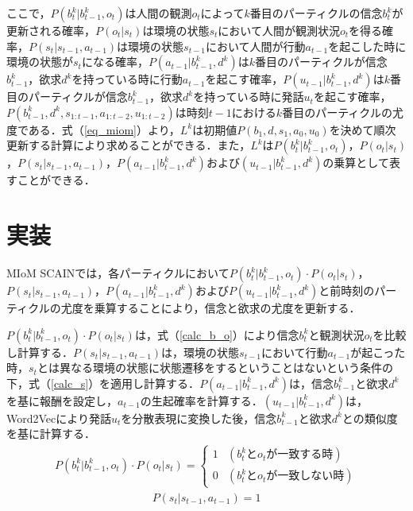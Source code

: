 ここで，$P(b_t^k|b_{t-1}^k,o_t)$は人間の観測$o_t$によって$k$番目のパーティクルの信念$b_t^k$が更新される確率，$P(o_t|s_t)$は環境の状態$s_t$において人間が観測状況$o_t$を得る確率，$P(s_t|s_{t-1},a_{t-1})$は環境の状態$s_{t-1}$において人間が行動$a_{t-1}$を起こした時に環境の状態が$s_{t}$になる確率，$P(a_{t-1}|b_{t-1}^k,d^k)$は$k$番目のパーティクルが信念$b_{t-1}^k$，欲求$d^k$を持っている時に行動$a_{t-1}$を起こす確率，$P(u_{t-1}|b_{t-1}^k,d^k)$は$k$番目のパーティクルが信念$b_{t-1}^k$，欲求$d^k$を持っている時に発話$u_t$を起こす確率，$P(b_{t-1}^k,d^k,s_{1:t-1},a_{1:t-2},u_{1:t-2})$は時刻$t-1$における$k$番目のパーティクルの尤度である．式（\ref{eq_miom}）より，$L^k$は初期値$P(b_1,d,s_1,a_0,u_0)$を決めて順次更新する計算により求めることができる．また，$L^k$は$P(b_t^k|b_{t-1}^k,o_t)$，$P(o_t|s_t)$，$P(s_t|s_{t-1},a_{t-1})$，$P(a_{t-1}|b_{t-1}^k,d^k)$および$(u_{t-1}|b_{t-1}^k,d^k)$の乗算として表すことができる．

\section{実装}
\par
MIoM SCAINでは，各パーティクルにおいて$P(b_t^k|b_{t-1}^k,o_t)\cdot P(o_t|s_t)$，$P(s_t|s_{t-1},a_{t-1})$，$P(a_{t-1}|b_{t-1}^k,d^k)$および$P(u_{t-1}|b_{t-1}^k,d^k)$と前時刻のパーティクルの尤度を乗算することにより，信念と欲求の尤度を更新する．
\par
$P(b_t^k|b_{t-1}^k,o_t)\cdot P(o_t|s_t)$は，式（\ref{calc_b_o}）により信念$b_t^k$と観測状況$o_t$を比較し計算する．$P(s_t|s_{t-1},a_{t-1})$は，環境の状態$s_{t-1}$において行動$a_{t-1}$が起こった時，$s_t$とは異なる環境の状態に状態遷移をするということはないという条件の下，式（\ref{calc_s}）を適用し計算する．$P(a_{t-1}|b_{t-1}^k,d^k)$は，信念$b_{t-1}^k$と欲求$d^k$を基に報酬を設定し，$a_{t-1}$の生起確率を計算する．$(u_{t-1}|b_{t-1}^k,d^k)$は，Word2Vec\cite{mikolov2013efficient}により発話$u_t$を分散表現に変換した後，信念$b_{t-1}^k$と欲求$d^k$との類似度を基に計算する．
\begin{equation}
  \begin{split}
  \label{calc_b_o}
  P(b_t^k|b_{t-1}^k,o_t)\cdot P(o_t|s_t)=
  \begin{cases}
    1 & (b_t^kとo_tが一致する時) \\
    0 & (b_t^kとo_tが一致しない時)
  \end{cases}
  \end{split}
\end{equation}
\begin{equation}
  \begin{split}
  \label{calc_s}
  P(s_t|s_{t-1},a_{t-1})=1
  \end{split}
\end{equation}
